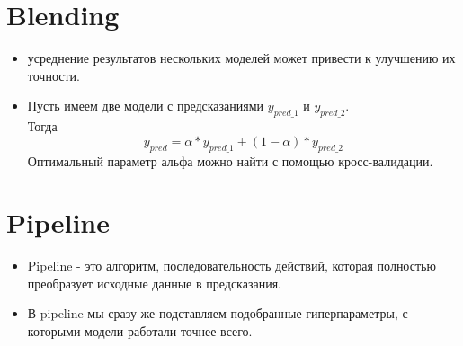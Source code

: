\documentclass{article}
\begin{document}
\section{Blending}
\begin{itemize}
\item усреднение результатов нескольких моделей может привести к улучшению их точности.
\item Пусть имеем две модели с предсказаниями $y_{pred\_1}$ и $y_{pred\_2}$.\\
Тогда
\[y_{pred} = \alpha * y_{pred\_1} + (1-\alpha)*y_{pred\_2} \]
Оптимальный параметр альфа можно найти с помощью кросс-валидации.  
\end{itemize}


\section{Pipeline}
\begin{itemize}
\item Pipeline - это алгоритм, последовательность действий, которая полностью преобразует исходные данные в предсказания.

\item В pipeline мы сразу же подставляем подобранные гиперпараметры, с которыми модели работали точнее всего.
\end{itemize}
 
\end{document}
